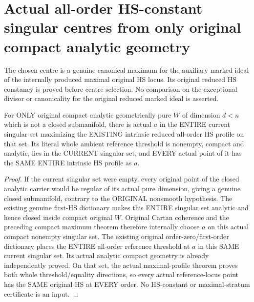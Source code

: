 \section{Actual all-order HS-constant singular centres from only original compact analytic geometry}

The chosen centre is a genuine canonical maximum for the auxiliary marked
ideal of the internally produced maximal original HS locus. Its original
reduced HS constancy is proved before centre selection. No comparison on
the exceptional divisor or canonicality for the original reduced marked
ideal is asserted.

\begin{theorem}
\label{hir:actual-original-singular-constant-maximal-hs-locus}
\leanok
For ONLY original compact analytic geometrically pure $W$ of dimension
$d<n$ which is not a closed submanifold, there is actual $a$ in the
ENTIRE current singular set maximizing the EXISTING intrinsic reduced
all-order HS profile on that set. Its literal whole ambient reference
threshold is nonempty, compact and analytic, lies in the CURRENT singular
set, and EVERY actual point of it has the SAME ENTIRE intrinsic HS profile
as $a$.
\end{theorem}
\begin{proof}
If the current singular set were empty, every original point of the
closed analytic carrier would be regular of its actual pure dimension,
giving a genuine closed submanifold, contrary to the ORIGINAL nonsmooth
hypothesis. The existing genuine first-HS dictionary makes this ENTIRE
singular set analytic and hence closed inside compact original $W$.
Original Cartan coherence and the preceding compact maximum theorem
therefore internally choose $a$ on this actual compact nonempty singular
set. The existing original order-zero/first-order dictionary places the
ENTIRE all-order reference threshold at $a$ in this SAME current singular
set. Its actual analytic compact geometry is already independently
proved. On that set, the actual maximal-profile theorem proves both
whole threshold/equality directions, so every actual reference-locus
point has the SAME original HS at EVERY order. No HS-constant or
maximal-stratum certificate is an input.
\end{proof}

